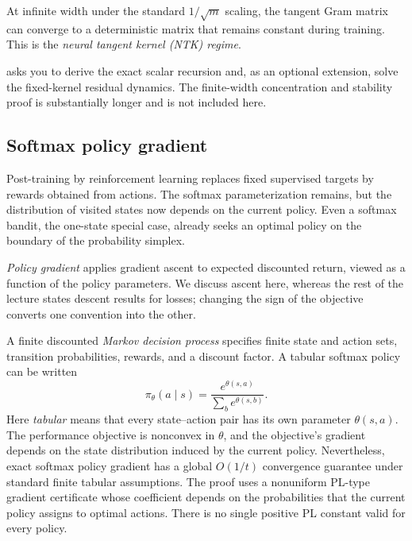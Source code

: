 \documentclass[11pt,twoside]{article}
\theoremstyle{definition}
\theoremstyle{remark}
\begin{document}
At infinite width under the standard $1/\sqrt m$ scaling, the tangent Gram
matrix can converge to a deterministic matrix that remains constant during
training. This is the \emph{neural tangent kernel (NTK) regime}.

 asks you to derive the exact scalar recursion and,
as an optional extension, solve the fixed-kernel residual dynamics. The
finite-width concentration and stability proof is substantially longer and
is not included here.

\subsection{Softmax policy gradient}
\label{sec:softmax-pg}

Post-training by reinforcement learning replaces fixed supervised targets by
rewards obtained from actions. The softmax parameterization remains, but the
distribution of visited states now depends on the current policy. Even a
softmax bandit, the one-state special case, already seeks an optimal policy on
the boundary of the probability simplex.

\emph{Policy gradient} applies gradient ascent to expected discounted return,
viewed as a function of the policy parameters. We discuss ascent here, whereas
the rest of the lecture states descent results for losses; changing the sign
of the objective converts one convention into the other.

A finite discounted \emph{Markov decision process} specifies finite state and
action sets, transition probabilities, rewards, and a discount factor. A
tabular softmax policy can be written
\[
 \pi_\theta(a\mid s)
 =\frac{e^{\theta(s,a)}}{\sum_b e^{\theta(s,b)}}.
\]
Here \emph{tabular} means that every state--action pair has its own parameter
$\theta(s,a)$.
The performance objective is nonconvex in $\theta$, and the objective's
gradient depends on the state distribution induced by the current policy.
Nevertheless, exact softmax policy gradient has a global $O(1/t)$ convergence
guarantee under standard finite tabular assumptions. The proof
uses a nonuniform PL-type gradient certificate whose coefficient depends on
the probabilities that the current policy assigns to optimal actions. There
is no single positive PL constant valid for every policy.
\end{document}
